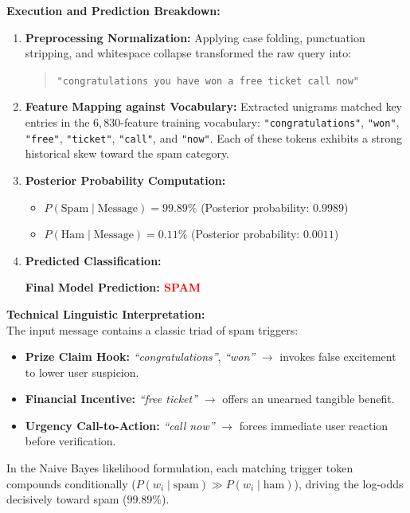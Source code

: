 \documentclass[11pt,a4paper]{article}
\begin{document}
\vspace{0.1cm}
\noindent\textbf{Execution and Prediction Breakdown:}
\begin{enumerate}
    \setlength{\itemsep}{2pt}
    \item \textbf{Preprocessing Normalization:} Applying case folding, punctuation stripping, and whitespace collapse transformed the raw query into:
    \begin{quote}
        \texttt{"congratulations you have won a free ticket call now"}
    \end{quote}
    \item \textbf{Feature Mapping against Vocabulary:} Extracted unigrams matched key entries in the $6,830$-feature training vocabulary: \texttt{"congratulations"}, \texttt{"won"}, \texttt{"free"}, \texttt{"ticket"}, \texttt{"call"}, and \texttt{"now"}. Each of these tokens exhibits a strong historical skew toward the spam category.
    \item \textbf{Posterior Probability Computation:}
    \begin{itemize}
        \setlength{\itemsep}{1pt}
        \item $P(\text{Spam} \mid \text{Message}) = \mathbf{99.89\%}$ \quad (Posterior probability: $0.9989$)
        \item $P(\text{Ham} \mid \text{Message}) = \mathbf{0.11\%}$ \quad (Posterior probability: $0.0011$)
    \end{itemize}
    \item \textbf{Predicted Classification:}
    \begin{center}
        \colorbox{red!10}{\large \textbf{Final Model Prediction: \textcolor{red}{SPAM}}}
    \end{center}
\end{enumerate}

\noindent\textbf{Technical Linguistic Interpretation:}\\
The input message contains a classic triad of spam triggers:
\begin{itemize}
    \setlength{\itemsep}{1pt}
    \item \textbf{Prize Claim Hook:} \textit{``congratulations''}, \textit{``won''} $\rightarrow$ invokes false excitement to lower user suspicion.
    \item \textbf{Financial Incentive:} \textit{``free ticket''} $\rightarrow$ offers an unearned tangible benefit.
    \item \textbf{Urgency Call-to-Action:} \textit{``call now''} $\rightarrow$ forces immediate user reaction before verification.
\end{itemize}
In the Naive Bayes likelihood formulation, each matching trigger token compounds conditionally ($P(w_i \mid \text{spam}) \gg P(w_i \mid \text{ham})$), driving the log-odds decisively toward spam ($99.89\%$).
\end{document}
